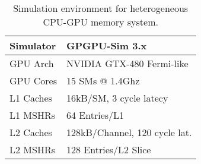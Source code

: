 \begin{table}[t]
\begin{center}
\begin{tabular}{|l|l|}
\hline
Simulator & GPGPU-Sim 3.x\\
\hline
GPU Arch & NVIDIA GTX-480 Fermi-like\\
\hline
GPU Cores& 15 {\color{black}SMs} @ 1.4Ghz\\
\hline
L1 Caches & 16kB/SM, 3 cycle latecy \\
\hline
L1 MSHRs & 64 Entries/L1\\
\hline
L2 Caches & 128kB/Channel, 120 cycle lat.\\
\hline
L2 MSHRs & 128 Entries/L2 Slice\\
\hline
\end{tabular}
\caption{Simulation environment for heterogeneous CPU-GPU memory system.}
\label{tab:methodology-basic}
\end{center}
\vspace{-0.15in}
\end{table}
